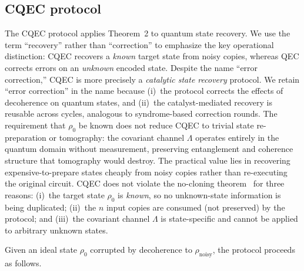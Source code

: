 \documentclass[a4paper,twocolumn]{quantumarticle}
\begin{document}
\subsection{CQEC protocol}
\label{sec:cqec_protocol}

The CQEC protocol applies Theorem~2 to quantum state recovery.
We use the term ``recovery'' rather than ``correction'' to emphasize the key operational distinction: CQEC recovers a \emph{known} target state from noisy copies, whereas QEC corrects errors on an \emph{unknown} encoded state.
Despite the name ``error correction,'' CQEC is more precisely a \emph{catalytic state recovery} protocol.
We retain ``error correction'' in the name because (i)~the protocol corrects the effects of decoherence on quantum states, and (ii)~the catalyst-mediated recovery is reusable across cycles, analogous to syndrome-based correction rounds.
The requirement that $\rho_0$ be known does not reduce CQEC to trivial state re-preparation or tomography: the covariant channel $\Lambda$ operates entirely in the quantum domain without measurement, preserving entanglement and coherence structure that tomography would destroy.
The practical value lies in recovering expensive-to-prepare states cheaply from noisy copies rather than re-executing the original circuit.
CQEC does not violate the no-cloning theorem~\cite{Wootters1982} for three reasons: (i)~the target state $\rho_0$ is \emph{known}, so no unknown-state information is being duplicated; (ii)~the $n$ input copies are consumed (not preserved) by the protocol; and (iii)~the covariant channel $\Lambda$ is state-specific and cannot be applied to arbitrary unknown states.

Given an ideal state $\rho_0$ corrupted by decoherence to $\rho_\mathrm{noisy}$, the protocol proceeds as follows.
\end{document}
